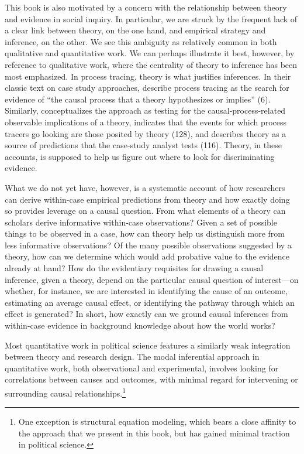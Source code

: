 \documentclass[
  12pt,
]{book}
\begin{document}
This book is also motivated by a concern with the relationship between theory and evidence in social inquiry. In particular, we are struck by the frequent lack of a clear link between theory, on the one hand, and empirical strategy and inference, on the other. We see this ambiguity as relatively common in both qualitative and quantitative work. We can perhaps illustrate it best, however, by reference to qualitative work, where the centrality of theory to inference has been most emphasized. In process tracing, theory is what justifies inferences. In their classic text on case study approaches, \citet{george2005case} describe process tracing as the search for evidence of ``the causal process that a theory hypothesizes or implies'' (6). Similarly, \citet{Hall2003aligning} conceptualizes the approach as testing for the causal-process-related observable implications of a theory, \citet{mahoney2010after} indicates that the events for which process tracers go looking are those posited by theory (128), and \citet{gerring2006case} describes theory as a source of predictions that the case-study analyst tests (116). Theory, in these accounts, is supposed to help us figure out where to look for discriminating evidence.

What we do not yet have, however, is a systematic account of how researchers can derive within-case empirical predictions from theory and how exactly doing so provides leverage on a causal question. From what elements of a theory can scholars derive informative within-case observations? Given a set of possible things to be observed in a case, how can theory help us distinguish more from less informative observations? Of the many possible observations suggested by a theory, how can we determine which would add probative value to the evidence already at hand? How do the evidentiary requisites for drawing a causal inference, given a theory, depend on the particular causal question of interest---on whether, for instance, we are interested in identifying the cause of an outcome, estimating an average causal effect, or identifying the pathway through which an effect is generated? In short, how exactly can we ground causal inferences from within-case evidence in background knowledge about how the world works?

Most quantitative work in political science features a similarly weak integration between theory and research design. The modal inferential approach in quantitative work, both observational and experimental, involves looking for correlations between causes and outcomes, with minimal regard for intervening or surrounding causal relationships.\footnote{One exception is structural equation modeling, which bears a close affinity to the approach that we present in this book, but has gained minimal traction in political science.}
\end{document}
